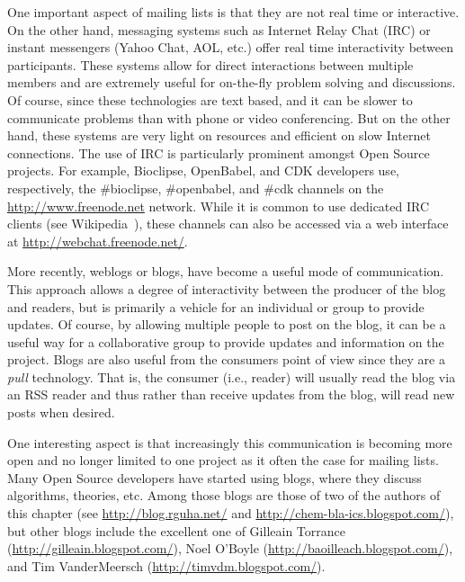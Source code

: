\documentclass[11pt]{book}
\begin{document}
One important aspect of mailing lists is that they are not real time
or interactive. On the other hand, messaging systems such as Internet
Relay Chat (IRC) or instant messengers (Yahoo Chat, AOL, etc.) offer
real time interactivity between participants. These systems allow for
direct interactions between multiple members and are extremely useful
for on-the-fly problem solving and discussions. Of course, since these
technologies are text based, and it can be slower to communicate
problems than with phone or video
conferencing. But on the other hand, these systems are very light on
resources and efficient on slow Internet connections. The use of
IRC is particularly prominent amongst Open Source projects. For
example, Bioclipse, OpenBabel, and CDK developers use, respectively,
the \#bioclipse, \#openbabel, and \#cdk channels on the
\url{http://www.freenode.net} network. While it is common to use
dedicated IRC clients (see Wikipedia~\cite{wp:ircclients}),
these channels can also be accessed via a web interface at
\url{http://webchat.freenode.net/}.

More recently, weblogs or blogs, have become a useful mode of
communication. This approach allows a degree of interactivity between
the producer of the blog and readers, but is primarily a vehicle for
an individual or group to provide updates. Of course, by allowing
multiple people to post on the blog, it can be a useful way for a
collaborative group to provide updates and information on the
project. Blogs are also useful from the consumers point of view since
they are a \emph{pull} technology. That is, the consumer (i.e.,
reader) will usually read the blog via an RSS reader and thus rather
than receive updates from the blog, will read new posts when desired.

One interesting aspect is that increasingly this communication
is becoming more open and no longer limited to one project as
it often the case for mailing lists. Many Open Source developers
have started using blogs, where they discuss algorithms, theories,
etc. Among those blogs are those of two of the authors of this
chapter (see \url{http://blog.rguha.net/} and
\url{http://chem-bla-ics.blogspot.com/}),
but other blogs include the excellent one of
Gilleain Torrance (\url{http://gilleain.blogspot.com/}),
Noel O'Boyle (\url{http://baoilleach.blogspot.com/}), and
Tim VanderMeersch (\url{http://timvdm.blogspot.com/}).
\end{document}
